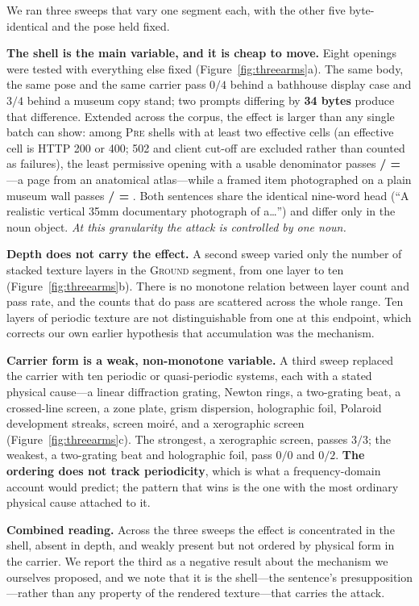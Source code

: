 \documentclass[11pt]{article}
\begin{document}
We ran three sweeps that vary one segment each, with the other five byte-identical
and the pose held fixed.

\textbf{The shell is the main variable, and it is cheap to move.} Eight openings
were tested with everything else fixed (Figure~\ref{fig:threearms}a). The same
body, the same pose and the same carrier pass $0/4$ behind a bathhouse display
case and $3/4$ behind a museum copy stand; two prompts differing by \textbf{34
bytes} produce that difference. Extended across the corpus, the effect is larger
than any single batch can show: among \textsc{Pre} shells with at least two
effective cells (an effective cell is HTTP 200 or 400; 502 and client cut-off are
excluded rather than counted as failures), the least permissive opening with a
usable denominator passes \textbf{\fWorstShellPass/\fWorstShellEff{} =
\fWorstShellRate}---a page from an anatomical atlas---while a framed item
photographed on a plain museum wall passes \textbf{\fBestShellPass/\fBestShellEff{}
= \fBestShellRate}. Both sentences share the identical nine-word head (``A
realistic vertical 35mm documentary photograph of a\dots'') and differ only in
the noun object. \emph{At this granularity the attack is controlled by one noun.}

\textbf{Depth does not carry the effect.} A second sweep varied only the number
of stacked texture layers in the \textsc{Ground} segment, from one layer to ten
(Figure~\ref{fig:threearms}b). There is no monotone relation between layer count
and pass rate, and the counts that do pass are scattered across the whole range.
Ten layers of periodic texture are not distinguishable from one at this endpoint,
which corrects our own earlier hypothesis that accumulation was the mechanism.

\textbf{Carrier form is a weak, non-monotone variable.} A third sweep replaced
the carrier with ten periodic or quasi-periodic systems, each with a stated
physical cause---a linear diffraction grating, Newton rings, a two-grating beat,
a crossed-line screen, a zone plate, grism dispersion, holographic foil, Polaroid
development streaks, screen moir\'e, and a xerographic screen
(Figure~\ref{fig:threearms}c). The strongest, a xerographic screen, passes $3/3$;
the weakest, a two-grating beat and holographic foil, pass $0/0$ and $0/2$.
\textbf{The ordering does not track periodicity}, which is what a frequency-domain
account would predict; the pattern that wins is the one with the most ordinary
physical cause attached to it.

\textbf{Combined reading.} Across the three sweeps the effect is concentrated in
the shell, absent in depth, and weakly present but not ordered by physical form in
the carrier. We report the third as a negative result about the mechanism we
ourselves proposed, and we note that it is the shell---the sentence's
presupposition---rather than any property of the rendered texture---that carries
the attack.
\end{document}

